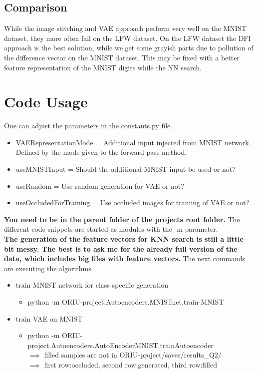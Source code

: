 \documentclass[
     11pt,         %
     a4paper,      %
     oneside,
     ]{article}
\begin{document}
\subsection{Comparison}
While the image stitching and VAE approach perform very well on the MNIST dataset, they more often fail on the LFW dataset. On the LFW dataset the DFI approach is the best solution, while we get some grayish parts due to pollution of the difference vector on the MNIST dataset. This may be fixed with a better feature representation of the MNIST digits while the NN search.

\newpage
\section{Code Usage}
One can adjust the parameters in the constants.py file.
\begin{itemize}
  \item VAERepresentationMode = Additional input injected from MNIST network. Defined by the mode given to the forward pass method.
  \item useMNISTInput = Should the additional MNIST input be used or not?
  \item useRandom = Use random generation for VAE or not?
  \item useOccludedForTraining = Use occluded images for training of VAE or not?
\end{itemize}
\textbf{You need to be in the parent folder of the projects root folder.}
The different code snippets are started as modules with the -m parameter.\\

\textbf{The generation of the feature vectors for KNN search is still a little bit messy. The best is to ask me for the already full version of the data, which includes big files with feature vectors. }
The next commands are executing the algorithms.
\begin{itemize}
  \item train MNIST network for class specific generation
  \begin{itemize}
    \item python -m ORIU-project.Autoencoders.MNISTnet.train-MNIST
  \end{itemize}
\end{itemize}

\begin{itemize}
  \item train VAE on MNIST
  \begin{itemize}
    \item python -m ORIU-project.Autoencoders.AutoEncoderMNIST.trainAutoencoder \\
    $\implies$ filled samples are not in ORIU-project/saves/results\_Q2/ \\
    $\implies$ first row:occluded, second row:generated, third row:filled
  \end{itemize}
\end{itemize}
\end{document}
